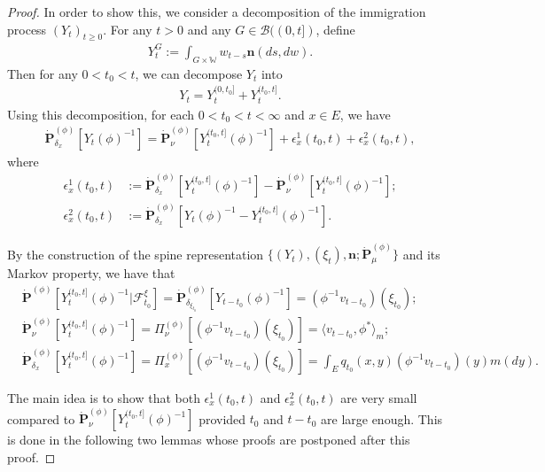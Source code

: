 \documentclass[12pt,a4paper]{amsart}
\theoremstyle{definition}
\numberwithin{equation}{section}
\begin{document}
\begin{proof}
In order to show this, we consider a decomposition of the immigration process $(Y_t)_{t\geq 0}$.
For any $t>0$ and any $G\in \mathscr B((0,t])$, define
\begin{align}
	Y^G_t
	:= \int_{G\times \mathbb W} w_{t-s} \mathbf n(ds,dw).
\end{align}
Then for any $0 < t_0 < t$, we can decompose $Y_t$ into
\begin{align}
	Y_t
	= Y^{(0,t_0]}_t + Y^{(t_0,t]}_t.
\end{align}
Using this decomposition, for each $0<t_0<t<\infty$ and $x\in E$, we have
\begin{align}
  \label{eq: starting point of phi-1v_t(x)}
  \dot{\mathbf P}_{\delta_x}^{(\phi)}[Y_t(\phi)^{-1}]
	= \dot {\mathbf P}_\nu^{(\phi)} [Y^{(t_0,t]}_t(\phi)^{-1}] + \epsilon_x^1(t_0,t) +\epsilon_x^2(t_0,t),
\end{align}
where
\begin{align}
	\epsilon_x^1(t_0,t)
	&:= \dot {\mathbf P}_{\delta_x}^{(\phi)} [Y^{(t_0,t]}_t(\phi)^{-1}] - \dot {\mathbf P}_\nu^{(\phi)} [Y^{(t_0,t]}_t(\phi)^{-1}];
	\\\epsilon_x^2(t_0,t)
	&:= \dot{\mathbf P}_{\delta_x}^{(\phi)}[Y_t(\phi)^{-1} - Y^{(t_0,t]}_t(\phi)^{-1}].
\end{align}

By the construction of the spine representation $\{(Y_t), (\xi_t),\mathbf n; \dot {\mathbf P}^{(\phi)}_\mu\}$ and its Markov property, we have that
\begin{align}
	\label{eq: some equations for PY-1-1}
	&\dot{\mathbf P}^{(\phi)} [Y_t^{(t_0,t]}(\phi)^{-1}|\mathscr F^\xi_{t_0}]
   = \dot{\mathbf P}_{\delta_{\xi_{t_0}}}^{(\phi)}  [Y_{t-t_0}(\phi)^{-1}]
   = (\phi^{-1}v_{t-t_0})(\xi_{t_0});
	\\ \label{eq: some equations for PY-1-2}
	&\dot{\mathbf P}_\nu^{(\phi)}[Y_t^{(t_0,t]}(\phi)^{-1}]
   = \Pi_{\nu}^{(\phi)}[(\phi^{-1}v_{t-t_0})(\xi_{t_0}) ]
   = \langle v_{t-t_0},\phi^* \rangle_m;
	\\ \label{eq: some equations for PY-1-3}
	&\dot{\mathbf P}_{\delta_x}^{(\phi)}[Y_t^{(t_0,t]}(\phi)^{-1}]
   = \Pi_x^{(\phi)}[(\phi^{-1}v_{t-t_0})(\xi_{t_0}) ]
   = \int_E  q_{t_0}(x,y)(\phi^{-1}v_{t-t_0})(y) m(dy).
\end{align}


The main idea is to show that
both $\epsilon_x^1(t_0,t)$ and $\epsilon_x^2(t_0,t)$ are very small compared to $\dot {\mathbf P}_\nu^{(\phi)}[Y_t^{(t_0,t]}(\phi)^{-1}]$ provided $t_0$ and $t- t_0$ are large enough.
This is done in the following two lemmas whose proofs are postponed after this proof.



\end{proof}
\end{document}
